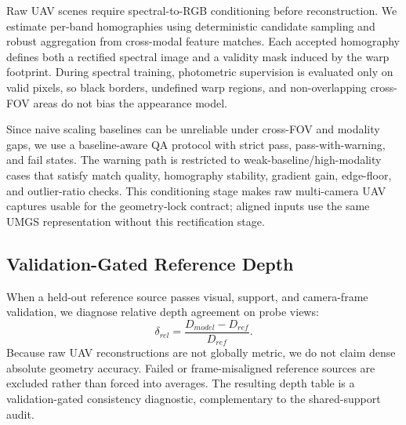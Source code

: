 Raw UAV scenes require spectral-to-RGB conditioning before reconstruction. We estimate per-band homographies using deterministic candidate sampling and robust aggregation from cross-modal feature matches. Each accepted homography defines both a rectified spectral image and a validity mask induced by the warp footprint. During spectral training, photometric supervision is evaluated only on valid pixels, so black borders, undefined warp regions, and non-overlapping cross-FOV areas do not bias the appearance model.

Since naive scaling baselines can be unreliable under cross-FOV and modality gaps, we use a baseline-aware QA protocol with strict pass, pass-with-warning, and fail states. The warning path is restricted to weak-baseline/high-modality cases that satisfy match quality, homography stability, gradient gain, edge-floor, and outlier-ratio checks. This conditioning stage makes raw multi-camera UAV captures usable for the geometry-lock contract; aligned inputs use the same UMGS representation without this rectification stage.

\subsection{Validation-Gated Reference Depth}

When a held-out reference source passes visual, support, and camera-frame validation, we diagnose relative depth agreement on probe views:
\[
\delta_{rel} = \frac{D_{model} - D_{ref}}{D_{ref}} .
\]
Because raw UAV reconstructions are not globally metric, we do not claim dense absolute geometry accuracy. Failed or frame-misaligned reference sources are excluded rather than forced into averages. The resulting depth table is a validation-gated consistency diagnostic, complementary to the shared-support audit.
